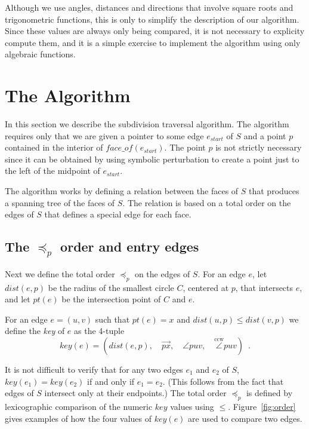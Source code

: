 \documentclass{article}
\newcommand{\seclabel}[1]{\label{sec:#1}}
\newcommand{\figref}[1]{\mbox{Figure~\ref{fig:#1}}}
\newcommand{\dist}{\mathit{dist}}
\newcommand{\pt}{\mathit{pt}}
\newcommand{\ccwangle}{\stackrel{\mathrm{ccw}}{\angle}}
\newcommand{\val}{\mathit{key}}
\newcommand{\face}{\mathit{face\_of}}
\newcommand{\key}{\mathit{key}}
\begin{document}
Although we use angles, distances and directions that involve square
roots and trigonometric functions, this is only to simplify the
description of our algorithm.  Since these values are always only
being compared, it is not necessary to explicity compute them, and it
is a simple exercise to implement the algorithm using only algebraic
functions.

\section{The Algorithm}\seclabel{alg}

In this section we describe the subdivision traversal algorithm.  The
algorithm requires only that we are given a pointer to some edge
$e_\mathit{start}$ of $S$ and a point $p$ contained in the interior of
$\face(e_\mathit{start})$.  The point $p$ is not strictly necessary
since it can be obtained by using symbolic perturbation to create a
point just to the left of the midpoint of
$e_\mathit{start}$.\cite{ads98}

The algorithm works by defining a relation between the faces of $S$
that produces a spanning tree of the faces of $S$.  The relation is
based on a total order on the edges of $S$ that defines a special edge
for each face.

\subsection{The $\preceq_p$ order and entry edges}

Next we define the total order $\preceq_p$ on the edges of $S$.  For
an edge $e$, let $\dist(e,p)$ be the radius of the smallest circle
$C$, centered at $p$, that intersects $e$, and let $\pt(e)$ be the
intersection point of $C$ and $e$.

For an edge $e=(u,v)$ such that $\pt(e)=x$ and
$\dist(u,p)\le\dist(v,p)$ we define the {\em key\/} of $e$ as the
4-tuple
\begin{equation}
\val(e) = \left( \dist(e,p) ,\quad \overrightarrow{px} ,\quad 
	\angle puv ,\quad \ccwangle puv \right) \enspace .
\end{equation}

It is not difficult to verify that for any two edges $e_1$ and $e_2$
of $S$, $\key(e_1)=\key(e_2)$ if and only if $e_1=e_2$. (This follows
from the fact that edges of $S$ intersect only at their endpoints.)
The total order $\preceq_p$ is defined by lexicographic comparison of
the numeric $\val$ values using $\le$.  \figref{order} gives examples
of how the four values of $\val(e)$ are used to compare two edges.
\end{document}
